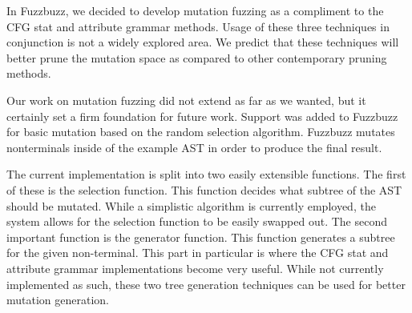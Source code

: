 In Fuzzbuzz, we decided to develop mutation fuzzing as a compliment to
the CFG stat and attribute grammar methods. Usage of these three
techniques in conjunction is not a widely explored area. We predict
that these techniques will better prune the mutation space as compared
to other contemporary pruning methods.

Our work on mutation fuzzing did not extend as far as we wanted, but
it certainly set a firm foundation for future work. Support was added
to Fuzzbuzz for basic mutation based on the random selection
algorithm. Fuzzbuzz mutates nonterminals inside of the example AST in
order to produce the final result.

The current implementation is split into two easily extensible
functions. The first of these is the selection function. This function
decides what subtree of the AST should be mutated. While a simplistic
algorithm is currently employed, the system allows for the selection
function to be easily swapped out. The second important function is
the generator function. This function generates a subtree for the
given non-terminal. This part in particular is where the CFG stat and
attribute grammar implementations become very useful. While not
currently implemented as such, these two tree generation techniques
can be used for better mutation generation.


